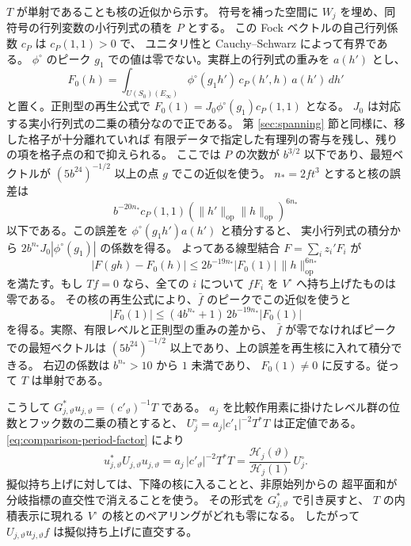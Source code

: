 \(T\) が単射であることも核の近似から示す。
符号を補った空間に \(W_j\) を埋め、同符号の行列変数の小行列式の積を \(P\) とする。
この Fock ベクトルの自己行列係数 \(c_P\) は \(c_P(1,1)>0\) で、
ユニタリ性と Cauchy--Schwarz によって有界である。
\(\phi^\circ\) のピーク \(g_1\) での値は零でない。実群上の行列式の重みを \(a(h')\) とし、
\[
 F_0(h)=\int_{U(S_0)(E_\infty)}
            \phi^\circ(g_1h')\,c_P(h',h)\,a(h')\,dh'
\]
と置く。正則型の再生公式で \(F_0(1)=J_0\phi^\circ(g_1)c_P(1,1)\) となる。
\(J_0\) は対応する実小行列式の二乗の積分なので正である。
第 \ref{sec:spanning} 節と同様に、移した格子が十分離れていれば
有限データで指定した有理列の寄与を残し、残りの項を格子点の和で抑えられる。
ここでは \(P\) の次数が \(b^{3/2}\) 以下であり、最短ベクトルが
\((5b^{24})^{-1/2}\) 以上の点 \(g\) でこの近似を使う。
\(n_*=2ft^3\) とすると核の誤差は
\[
 b^{-20n_*}c_P(1,1)(\|h'\|_{\mathrm{op}}\|h\|_{\mathrm{op}})^{6n_*}
\]
以下である。この誤差を \(\phi^\circ(g_1h')a(h')\) と積分すると、
実小行列式の積分から \(2b^{n_*}J_0|\phi^\circ(g_1)|\) の係数を得る。
よってある線型結合 \(F=\sum_i z_i'F_i\) が
\[
 |F(gh)-F_0(h)|\le 2b^{-19n_*}|F_0(1)|\,\|h\|_{\mathrm{op}}^{6n_*}
\]
を満たす。もし \(Tf=0\) なら、全ての \(i\) について
\(fF_i\) を \(V^\circ\) へ持ち上げたものは零である。
その核の再生公式により、\(\bar f\) のピークでこの近似を使うと
\[
 |F_0(1)|\le (4b^{n_*}+1)\,2b^{-19n_*}|F_0(1)|
\]
を得る。実際、有限レベルと正則型の重みの差から、
\(\bar f\) が零でなければピークでの最短ベクトルは
\((5b^{24})^{-1/2}\) 以上であり、上の誤差を再生核に入れて積分できる。
右辺の係数は \(b^{n_*}>10\) から \(1\) 未満であり、
\(F_0(1)\ne0\) に反する。従って \(T\) は単射である。

こうして \(G_{j,\vartheta}^*u_{j,\vartheta}=(c'_\vartheta)^{-1}T\) である。
\(a_j\) を比較作用素に掛けたレベル群の位数とフック数の二乗の積とすると、
\(U_j^\circ=a_j|c'_1|^{-2}T^*T\) は正定値である。
\eqref{eq:comparison-period-factor} により
\[
 u_{j,\vartheta}^*U_{j,\vartheta}u_{j,\vartheta}
   =a_j\,|c'_\vartheta|^{-2}T^*T
   =\frac{\mathcal H_j(\vartheta)}{\mathcal H_j(1)}\,U_j^\circ.
\]
擬似持ち上げに対しては、下降の核に入ることと、非原始列からの
超平面和が分岐指標の直交性で消えることを使う。
その形式を \(G_{j,\vartheta}^*\) で引き戻すと、
\(T\) の内積表示に現れる \(V^\circ\) の核とのペアリングがどれも零になる。
したがって \(U_{j,\vartheta}u_{j,\vartheta} f\) は擬似持ち上げに直交する。
